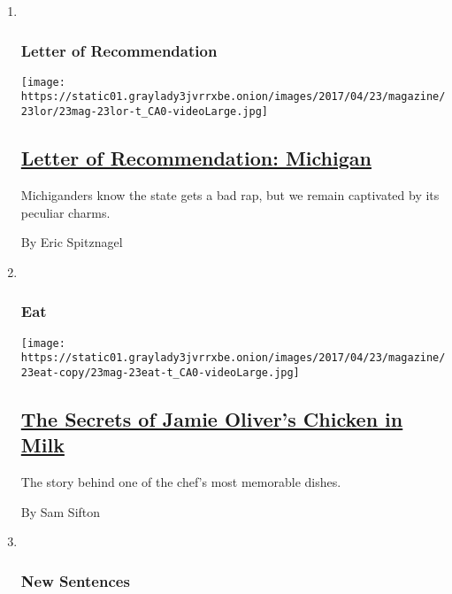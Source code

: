 \begin{enumerate}
\def\labelenumi{\arabic{enumi}.}
\item ~
  \hypertarget{letter-of-recommendation}{%
  \subsubsection{Letter of
  Recommendation}\label{letter-of-recommendation}}

  \texttt{[image: https://static01.graylady3jvrrxbe.onion/images/2017/04/23/magazine/23lor/23mag-23lor-t\_CA0-videoLarge.jpg]}

  \hypertarget{letter-of-recommendation-michigan}{%
  \subsection{\texorpdfstring{\href{/2017/04/20/magazine/letter-of-recommendation-michigan.html}{Letter
  of Recommendation:
  Michigan}}{Letter of Recommendation: Michigan}}\label{letter-of-recommendation-michigan}}

  Michiganders know the state gets a bad rap, but we remain captivated
  by its peculiar charms.

  By Eric Spitznagel
\item ~
  \hypertarget{eat}{%
  \subsubsection{Eat}\label{eat}}

  \texttt{[image: https://static01.graylady3jvrrxbe.onion/images/2017/04/23/magazine/23eat-copy/23mag-23eat-t\_CA0-videoLarge.jpg]}

  \hypertarget{the-secrets-of-jamie-olivers-chicken-in-milk}{%
  \subsection{\texorpdfstring{\href{/2017/04/20/magazine/the-secrets-of-jamie-olivers-chicken-in-milk.html}{The
  Secrets of Jamie Oliver's Chicken in
  Milk}}{The Secrets of Jamie Oliver's Chicken in Milk}}\label{the-secrets-of-jamie-olivers-chicken-in-milk}}

  The story behind one of the chef's most memorable dishes.

  By Sam Sifton
\item ~
  \hypertarget{new-sentences}{%
  \subsubsection{New Sentences}\label{new-sentences}}


\end{enumerate}
